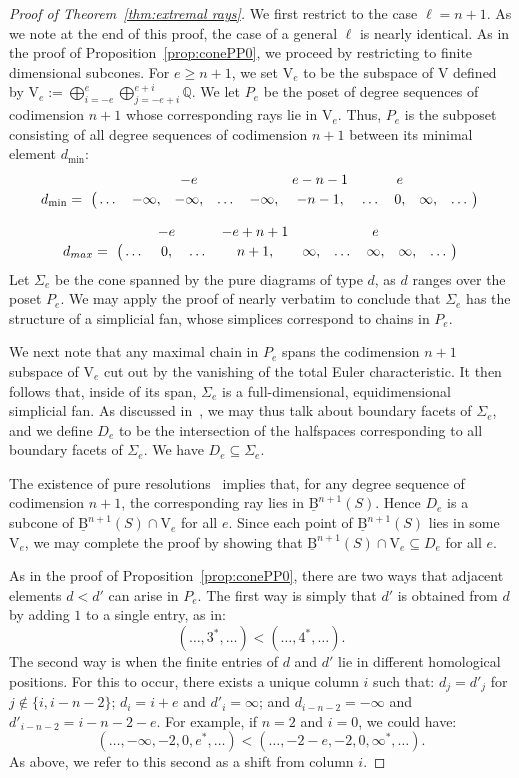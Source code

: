 \documentclass[12pt]{amsart}
\theoremstyle{definition}
\theoremstyle{remark}
\newcommand{\QQ}{\mathbb{Q}}
\newcommand{\VV}{\mathrm{V}}
\newcommand{\BBQ}{\underline{\mathrm{B}}}
\begin{document}
\begin{proof}[Proof of Theorem~\ref{thm:extremal rays}]
We first restrict to the case $\ell=n+1$.  As we note at the end of this proof, the case of a general $\ell$ is nearly identical.
As in the proof of Proposition~\ref{prop:conePP0}, we proceed by restricting to finite dimensional subcones.  For $e\geq n+1$, we set $\VV_e$ to be the subspace of $\VV$ defined by $\VV_e:=\bigoplus_{i=-e}^e \bigoplus_{j=-e+i}^{e+i} \QQ$.  We let $P_e$ be the poset of degree sequences of codimension $n+1$ whose corresponding rays lie in $\VV_e$.  Thus, $P_e$ is the subposet consisting of all degree sequences of codimension $n+1$ between its minimal element $d_{\min}$:
\[\bordermatrix{&&&-e&&&e-n-1&&e &&\cr
              d_{\min}= &\dots&-\infty,&-\infty,&\dots&-\infty,&-n-1,&\dots &0, &\infty,&\dots\cr}\]

\[\bordermatrix{&&-e&&-e+n+1&&&e &&\cr
              d_{max}= &\dots&0,&\dots&n+1,&\infty,&\dots &\infty,&\infty,&\dots\cr}\]
Let $\Sigma_e$ be the cone spanned by the pure diagrams of type $d$, as $d$ ranges over the poset $P_e$.  We may apply the proof of  \cite[2.9]{boij-sod1} nearly verbatim to conclude that $\Sigma_e$ has the structure of a simplicial fan, whose simplices correspond to chains in $P_e$.

We next note that any maximal chain in $P_e$ spans the codimension $n+1$ subspace of $\VV_e$ cut out by the vanishing of the total Euler characteristic.  It then follows that, inside of its span, $\Sigma_e$ is a full-dimensional, equidimensional simplicial fan.  As discussed in~\cite[Appendix A]{bbeg}, we may thus talk about boundary facets of $\Sigma_e$, and we define $D_e$ to be the intersection of the halfspaces corresponding to all boundary facets of $\Sigma_e$.  We have $D_e\subseteq \Sigma_e$.

The existence of pure resolutions~\cite[Theorem~0.1]{eis-schrey1} implies that, for any degree sequence of codimension $n+1$, the corresponding ray lies in $\BBQ^{n+1}(S)$.  Hence $D_e$ is a subcone of $\BBQ^{n+1}(S)\cap \VV_e$ for all $e$.  Since each point of $\BBQ^{n+1}(S)$ lies in some $\VV_e$, we may complete the proof by showing that  $\BBQ^{n+1}(S)\cap \VV_e \subseteq D_e$ for all $e$.  



As in the proof of Proposition~\ref{prop:conePP0}, there are two ways  that adjacent elements $d<d'$ can arise in $P_e$.  The first way is simply that $d'$ is obtained from $d$ by adding $1$ to a single entry, as in:
\[
(\dots,3^*,\dots)<(\dots,4^*,\dots).
\]
The second way is when the finite entries of $d$ and $d'$ lie in different homological positions.  For this to occur, there exists a unique column $i$ such that: $d_j=d'_j$ for $j\notin \{i, i-n-2\}$; $d_i=i+e$ and $d'_i=\infty$; and $d_{i-n-2}=-\infty$ and $d'_{i-n-2}=i-n-2-e$.  For example, if $n=2$ and $i=0$, we could have:
\[
(\dots, -\infty, -2, 0, e^*, \dots)<(\dots, -2-e,-2, 0, \infty^*, \dots).
\]
As above, we refer to this second as a shift from column $i$.



\end{proof}
\end{document}
